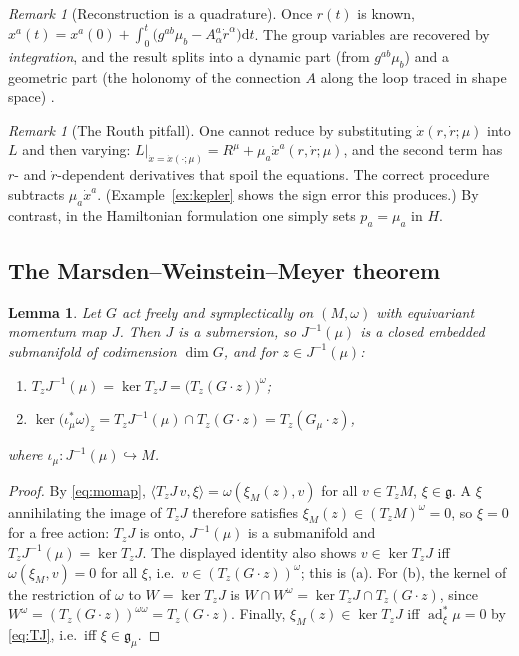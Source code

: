 \documentclass[11pt,a4paper]{article}
\numberwithin{equation}{section}
\theoremstyle{plain}
\newtheorem{lemma}[theorem]{Lemma}
\theoremstyle{definition}
\theoremstyle{remark}
\newtheorem{remark}[theorem]{Remark}
\newcommand{\frakg}{\mathfrak{g}}
\newcommand{\ad}{\operatorname{ad}}
\newcommand{\pair}[2]{\langle #1,#2\rangle}
\newcommand{\dd}{\mathrm{d}}
\begin{document}
\begin{remark}[Reconstruction is a quadrature]\label{rem:quad}
Once $r(t)$ is known, $x^a(t)=x^a(0)+\int_0^t\big(g^{ab}\mu_b-A^a_\alpha\dot r^\alpha\big)\dd t$. The group variables are recovered by \emph{integration}, and the result splits into a dynamic part (from $g^{ab}\mu_b$) and a geometric part (the holonomy of the connection $A$ along the loop traced in shape space) \cite{mmr1990,montgomery1991}.
\end{remark}

\begin{remark}[The Routh pitfall]\label{rem:pitfall1}
One cannot reduce by substituting $\dot x(r,\dot r;\mu)$ into $L$ and then varying: $L|_{\dot x=\dot x(\cdot;\mu)}=R^\mu+\mu_a\dot x^a(r,\dot r;\mu)$, and the second term has $r$- and $\dot r$-dependent derivatives that spoil the equations. The correct procedure subtracts $\mu_a\dot x^a$. (Example~\ref{ex:kepler} shows the sign error this produces.) By contrast, in the Hamiltonian formulation one simply sets $p_a=\mu_a$ in $H$.
\end{remark}

\subsection{The Marsden--Weinstein--Meyer theorem}\label{sec:MWM}

\begin{lemma}\label{lem:kernel}
Let $G$ act freely and symplectically on $(M,\omega)$ with equivariant momentum map $J$. Then $J$ is a submersion, so $J^{-1}(\mu)$ is a closed embedded submanifold of codimension $\dim G$, and for $z\in J^{-1}(\mu)$:
\begin{enumerate}[label=(\alph*)]
\item $T_zJ^{-1}(\mu)=\ker T_zJ=\big(T_z(G\cdot z)\big)^\omega$;
\item $\ker\big(\iota_\mu^*\omega\big)_z=T_zJ^{-1}(\mu)\cap T_z(G\cdot z)=T_z(G_\mu\cdot z)$,
\end{enumerate}
where $\iota_\mu:J^{-1}(\mu)\hookrightarrow M$.
\end{lemma}
\begin{proof}
By \eqref{eq:momap}, $\pair{T_zJ\,v}{\xi}=\omega(\xi_M(z),v)$ for all $v\in T_zM$, $\xi\in\frakg$. A $\xi$ annihilating the image of $T_zJ$ therefore satisfies $\xi_M(z)\in(T_zM)^\omega=0$, so $\xi=0$ for a free action: $T_zJ$ is onto, $J^{-1}(\mu)$ is a submanifold and $T_zJ^{-1}(\mu)=\ker T_zJ$. The displayed identity also shows $v\in\ker T_zJ$ iff $\omega(\xi_M,v)=0$ for all $\xi$, i.e.\ $v\in(T_z(G\cdot z))^\omega$; this is (a). For (b), the kernel of the restriction of $\omega$ to $W=\ker T_zJ$ is $W\cap W^\omega=\ker T_zJ\cap T_z(G\cdot z)$, since $W^\omega=(T_z(G\cdot z))^{\omega\omega}=T_z(G\cdot z)$. Finally, $\xi_M(z)\in\ker T_zJ$ iff $\ad^*_\xi\mu=0$ by \eqref{eq:TJ}, i.e.\ iff $\xi\in\frakg_\mu$.
\end{proof}
\end{document}
